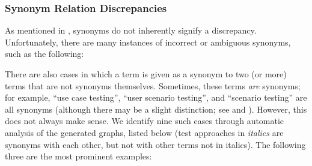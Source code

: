 \ifnotpaper
    \begin{landscape}
        
    \end{landscape}
\else %
\fi

\subsubsection{Synonym Relation Discrepancies}
\label{syns}

As mentioned in , synonyms do not inherently signify a
discrepancy. Unfortunately, there are many instances of incorrect or ambiguous
synonyms, such as the following:



\label{multiSyns}
There are also cases in which a term is given as a synonym to two (or more)
terms that are not synonyms themselves. Sometimes, these terms
\emph{are} synonyms; for example, \citetISTQB{} 
``use case testing'', ``user scenario testing'', and ``scenario testing'' are
all synonyms (although there may be a slight distinction; see
 and ).
%
%
%
%
However, this does not always make sense. We identify nine
such cases through automatic analysis of the generated graphs\ifnotpaper,
listed below (test approaches in \emph{italics} are synonyms with each other,
but not with other terms not in italics)\else. The following three are the most prominent examples\fi:


